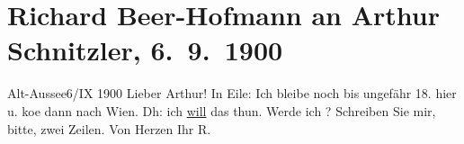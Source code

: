 

         
         \renewcommand{\erwaehntePersonen}{Personen: Paul Goldmann}
         \renewcommand{\erwaehnteOrte}{Orte: Altaussee, Wien}
         \renewcommand{\erwaehnteWerke}{}
               \section[Richard Beer-Hofmann an Arthur Schnitzler, 6. 9. 1900]{ Richard Beer-Hofmann an Arthur Schnitzler, 6. 9. 1900}\nopagebreak{}\rehead{ }\begin{ledgroupsized}[t]{13cm}\normalsize\beginnumbering \toendnotes[C]{\smallbreak\pagebreak[2]} 
\toendnotes[C]{\smallbreak}\pstart
           \raggedleft{}{\pb}Alt-Aussee6/IX 1900\pend
           \pstart
           Lieber Arthur! In Eile: Ich bleibe noch bis ungefähr
                  18. hier u. ko{\geminationm}e dann nach Wien. Dh: ich \uline{will}
               das thun. Werde ich \label{K_L01071-12v}\label{K_L01071-12h}?\pend
           \pstart
           Schreiben Sie mir, bitte, zwei Zeilen.\pend
           \pstart Von Herzen Ihr \spacefill\mbox{R.}\pend{}
         
         \endnumbering{}\end{ledgroupsized}  \newcommand{\dateiname}{L01071}\newcommand{\titel}{Richard Beer-Hofmann an Arthur Schnitzler, 6. 9. 1900}\newcommand{\editorInnen}{Martin Anton Müller und Gerd-Hermann Susen}
      